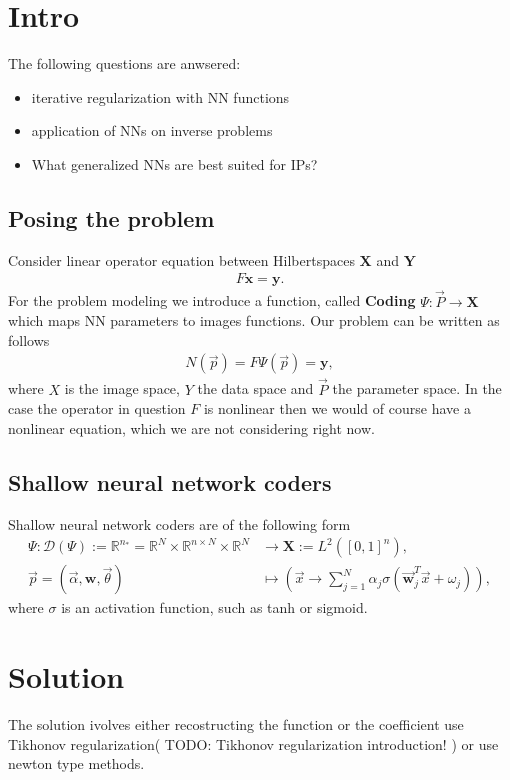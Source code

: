 




\maketitle

\tableofcontents

\section{Intro}
The following questions are anwsered:
\begin{itemize}
    \item iterative regularization with NN functions
    \item application of NNs on inverse problems
    \item What generalized NNs are best suited for IPs?
\end{itemize}

\subsection{Posing the problem}
Consider linear operator equation between Hilbertspaces $\mathbf{X}$ and
$\mathbf{Y}$
\begin{align}
    F\mathbf{x} = \mathbf{y}.
\end{align}
For the problem modeling we introduce a function, called \textbf{Coding}
$\Psi: \vec{P} \to \mathbf{X}$ which maps NN parameters to images functions.
Our problem can be written as follows
\begin{align}
    N(\vec{p}) = F\Psi(\vec{p}) = \mathbf{y},
\end{align}
where $X$ is the image space, $Y$ the data space and $\vec{P}$ the parameter
space. In the case the operator in question $F$ is nonlinear then we would of
course have a nonlinear equation, which we are not considering right now.

\subsection{Shallow neural network coders}
Shallow neural network coders are of the following form
\begin{align}
    \Psi:
    \mathcal{D}(\Psi) := \mathbb{R}^{n_*} =
    \mathbb{R}^{N}\times \mathbb{R}^{n \times N}
    \times \mathbb{R}^{N}
    &\to \mathbf{X} :=
    L^{2}\left([0, 1]^{n}\right),\\
    \vec{p} = (\vec{\alpha}, \mathbf{w}, \vec{\theta}) &\mapsto
    \left(\vec{x} \to \sum_{j=1}^{N} \alpha_j\sigma\left(
    \vec{\mathbf{w}}_j^{T}\vec{x} + \omega_j \right)  \right),
\end{align}
where $\sigma$ is an activation function, such as tanh or sigmoid.

\section{Solution}
The solution ivolves either recostructing the function or the coefficient use
Tikhonov regularization( TODO: Tikhonov regularization introduction! ) or use
newton type methods.



